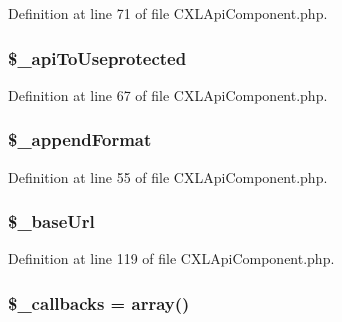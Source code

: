 Definition at line 71 of file CXLApiComponent.php.

\hypertarget{classCXLApiComponent_abdfb5848bea7acb66e39972358f344a8}{
\subsubsection[{\$\_\-apiToUseprotected}]{\setlength{\rightskip}{0pt plus 5cm}\$\_\-apiToUseprotected}}
\label{classCXLApiComponent_abdfb5848bea7acb66e39972358f344a8}


Definition at line 67 of file CXLApiComponent.php.

\hypertarget{classCXLApiComponent_ae027f791b6a2fc198dfabc3e2693f585}{
\subsubsection[{\$\_\-appendFormat}]{\setlength{\rightskip}{0pt plus 5cm}\$\_\-appendFormat}}
\label{classCXLApiComponent_ae027f791b6a2fc198dfabc3e2693f585}


Definition at line 55 of file CXLApiComponent.php.

\hypertarget{classCXLApiComponent_ae5c686cdf8e6a089b6296dcb659f6d01}{
\subsubsection[{\$\_\-baseUrl}]{\setlength{\rightskip}{0pt plus 5cm}\$\_\-baseUrl}}
\label{classCXLApiComponent_ae5c686cdf8e6a089b6296dcb659f6d01}


Definition at line 119 of file CXLApiComponent.php.

\hypertarget{classCXLApiComponent_ae1d5e7a4a34ac8fa4dbdef28983a1fcc}{
\subsubsection[{\$\_\-callbacks}]{\setlength{\rightskip}{0pt plus 5cm}\$\_\-callbacks = array()}}
\label{classCXLApiComponent_ae1d5e7a4a34ac8fa4dbdef28983a1fcc}


